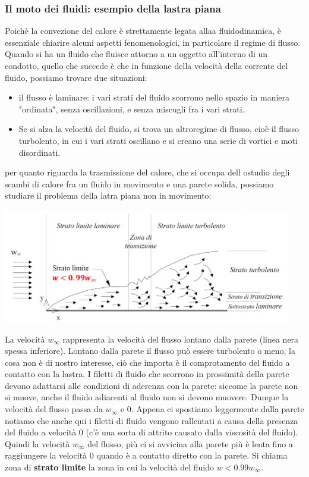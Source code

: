 \subsubsection{Il moto dei fluidi: esempio della lastra piana}
Poichè la convezione del calore è strettamente legata allaa fluidodinamica, è essenziale chiarire alcuni aspetti fenomenologici, in particolare il regime di flusso. Quando si ha un fluido che fluisce attorno a un oggetto all'interno di un condotto, quello che succede è che in funzione della velocità della corrente del fluido, possiamo trovare due situazioni:
\begin{itemize}
    \item il flusso è laminare: i vari strati del fluido scorrono nello spazio in maniera "ordinata", senza oscillazioni, e senza miscugli fra i vari strati.
    \item Se si alza la velocità del fluido, si trova un altroregime di flusso, cioè il flusso turbolento, in cui i vari strati oscillano e si creano una serie di vortici e moti disordinati.
\end{itemize}
per quanto riguarda la trasmissione del calore, che si occupa dell ostudio degli scambi di calore fra un fluido in movimento e una parete solida, possiamo studiare il problema della latra piana non in movimento:
\begin{center}
    \includegraphics[height=5cm]{../L11/img1.PNG}
\end{center}
La velocità $w_{\infty}$ rappresenta la velocità del flusso lontano dalla parete (linea nera spessa inferiore). Lontano dalla parete il flusso può essere turbolento o meno, la cosa non è di nostro interesse, ciò che importa è il comprotamento del fluido a contatto con la lastra.\newline
I filetti di fluido che scorrono in prossimità della parete devono adattarsi alle condizioni di aderenza con la parete: siccome la parete non si muove, anche il fluido adiacenti al fluido non si devono muovere. Dunque la velocità del flusso passa da $w_{\infty}$ e $0$. Appena ci spostiamo leggermente dalla parete notiamo che anche qui i filetti di fluido vengono rallentati a causa della presenza del fluido a velocità $0$ (c'è una sorta di attrito causato dalla viscosità del fluido). Quindi la velocità $w_{\infty}$ del flusso, più ci si avvicina alla parete più è lenta fino a raggiungere la velocità $0$ quando è a contatto diretto con la parete. Si chiama zona di \textbf{strato limite} la zona in cui la velocità del fluido $w < 0.99 w_{\infty}$.\newline
